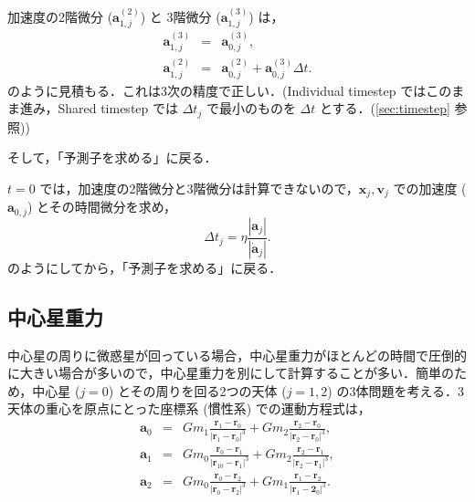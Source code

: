 \documentclass[11pt,a4paper,oneside,onecolumn]{jreport}
\begin{document}
加速度の2階微分 (${\bm a}_{1,j}^{(2)}$) と 3階微分 (${\bm a}_{1,j}^{(3)}$) は，
\begin{eqnarray}
{\bm a}_{1,j}^{(3)} & = & {\bm a}_{0,j}^{(3)}, \\
{\bm a}_{1,j}^{(2)} & = & {\bm a}_{0,j}^{(2)} + {\bm a}_{0,j}^{(3)} \Delta t. 
\end{eqnarray}
のように見積もる．これは3次の精度で正しい．(Individual timestep ではこのまま進み，Shared timestep では $\Delta t_j$ で最小のものを $\Delta t$ とする．(\ref{sec:timestep} 参照))

そして，「予測子を求める」に戻る．

$t = 0$ では，加速度の2階微分と3階微分は計算できないので，${\bm x}_j,{\bm v}_j$ での加速度 (${\bm a}_{0,j}$) とその時間微分を求め，
\begin{equation}
\Delta t_j = \eta \frac{|{\bm a}_j|}{|\dot{{\bm a}}_j|}.
\end{equation}
のようにしてから，「予測子を求める」に戻る．

\subsection{中心星重力}
中心星の周りに微惑星が回っている場合，中心星重力がほとんどの時間で圧倒的に大きい場合が多いので，中心星重力を別にして計算することが多い．簡単のため，中心星 ($j = 0$) とその周りを回る2つの天体 ($j = 1, 2$) の3体問題を考える．3天体の重心を原点にとった座標系 (慣性系) での運動方程式は，
\begin{eqnarray}
{\bm a}_0 & = & G m_1 \frac{{\bm r}_1 - {\bm r}_0}{|{\bm r}_1 - {\bm r}_0|^3} + G m_2  \frac{{\bm r}_2 - {\bm r}_0}{|{\bm r}_2 - {\bm r}_0|^3}, \label{eq:a0}\\
{\bm a}_1 & = & G m_0 \frac{{\bm r}_0 - {\bm r}_1}{|{\bm r}_10- {\bm r}_1|^3} + G m_2  \frac{{\bm r}_2 - {\bm r}_1}{|{\bm r}_2 - {\bm r}_1|^3}, \label{eq:a1}\\
{\bm a}_2 & = & G m_0 \frac{{\bm r}_0 - {\bm r}_2}{|{\bm r}_0 - {\bm r}_2|^3} + G m_1  \frac{{\bm r}_1 - {\bm r}_2}{|{\bm r}_1 - {\bm 2}_0|^3}. \label{eq:a2}
\end{eqnarray}
\end{document}
